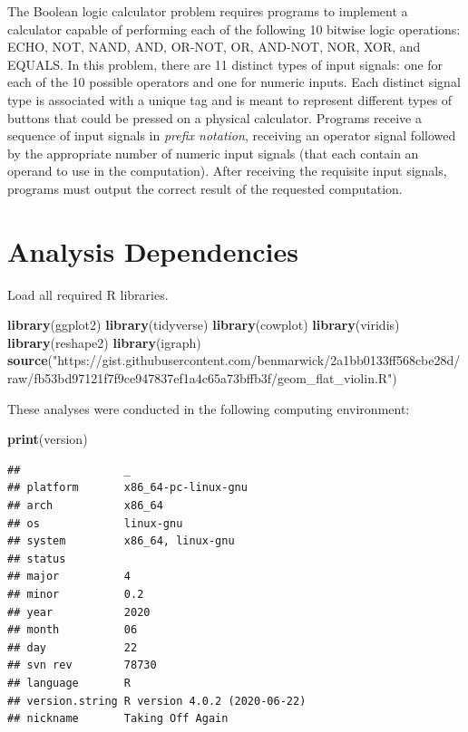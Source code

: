 \documentclass[
]{book}
\newenvironment{Shaded}{\begin{snugshade}}{\end{snugshade}}
\newcommand{\KeywordTok}[1]{\textcolor[rgb]{0.13,0.29,0.53}{\textbf{#1}}}
\newcommand{\NormalTok}[1]{#1}
\newcommand{\StringTok}[1]{\textcolor[rgb]{0.31,0.60,0.02}{#1}}
\begin{document}
The Boolean logic calculator problem requires programs to implement a calculator capable of performing each of the following 10 bitwise logic operations:
ECHO, NOT, NAND, AND, OR-NOT, OR, AND-NOT, NOR, XOR, and EQUALS.
In this problem, there are 11 distinct types of input signals: one for each of the 10 possible operators and one for numeric inputs.
Each distinct signal type is associated with a unique tag and is meant to represent different types of buttons that could be pressed on a physical calculator.
Programs receive a sequence of input signals in \emph{prefix notation}, receiving an operator signal followed by the appropriate number of numeric input signals (that each contain an operand to use in the computation).
After receiving the requisite input signals, programs must output the correct result of the requested computation.

\hypertarget{analysis-dependencies-3}{%
\section{Analysis Dependencies}\label{analysis-dependencies-3}}

Load all required R libraries.

\begin{Shaded}
\begin{Highlighting}[]
\KeywordTok{library}\NormalTok{(ggplot2)}
\KeywordTok{library}\NormalTok{(tidyverse)}
\KeywordTok{library}\NormalTok{(cowplot)}
\KeywordTok{library}\NormalTok{(viridis)}
\KeywordTok{library}\NormalTok{(reshape2)}
\KeywordTok{library}\NormalTok{(igraph)}
\KeywordTok{source}\NormalTok{(}\StringTok{"https://gist.githubusercontent.com/benmarwick/2a1bb0133ff568cbe28d/raw/fb53bd97121f7f9ce947837ef1a4c65a73bffb3f/geom\_flat\_violin.R"}\NormalTok{)}
\end{Highlighting}
\end{Shaded}

These analyses were conducted in the following computing environment:

\begin{Shaded}
\begin{Highlighting}[]
\KeywordTok{print}\NormalTok{(version)}
\end{Highlighting}
\end{Shaded}

\begin{verbatim}
##                _                           
## platform       x86_64-pc-linux-gnu         
## arch           x86_64                      
## os             linux-gnu                   
## system         x86_64, linux-gnu           
## status                                     
## major          4                           
## minor          0.2                         
## year           2020                        
## month          06                          
## day            22                          
## svn rev        78730                       
## language       R                           
## version.string R version 4.0.2 (2020-06-22)
## nickname       Taking Off Again
\end{verbatim}
\end{document}
